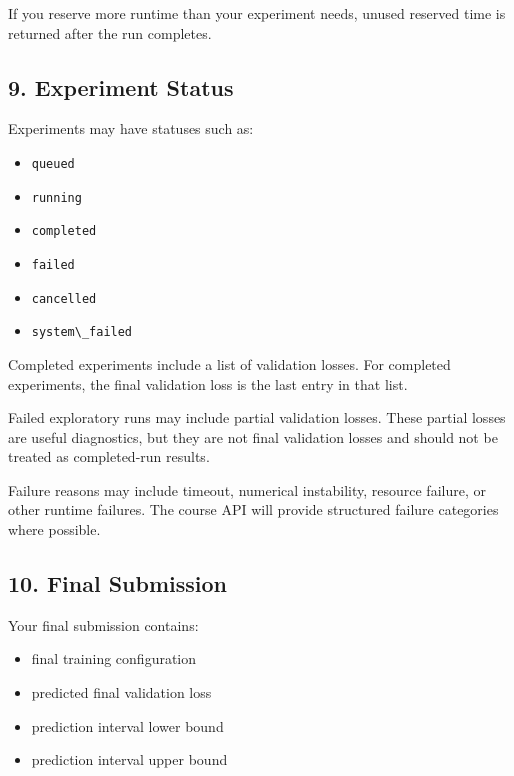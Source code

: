 \documentclass[
  11pt,
]{article}
\newcommand{\passthrough}[1]{#1}
\providecommand{\tightlist}{%
  \setlength{\itemsep}{0pt}\setlength{\parskip}{0pt}}
\begin{document}
If you reserve more runtime than your experiment needs, unused reserved
time is returned after the run completes.

\hypertarget{experiment-status}{%
\subsection{9. Experiment Status}\label{experiment-status}}

Experiments may have statuses such as:

\begin{itemize}
\tightlist
\item
  \passthrough{\lstinline!queued!}
\item
  \passthrough{\lstinline!running!}
\item
  \passthrough{\lstinline!completed!}
\item
  \passthrough{\lstinline!failed!}
\item
  \passthrough{\lstinline!cancelled!}
\item
  \passthrough{\lstinline!system\_failed!}
\end{itemize}

Completed experiments include a list of validation losses. For completed
experiments, the final validation loss is the last entry in that list.

Failed exploratory runs may include partial validation losses. These
partial losses are useful diagnostics, but they are not final validation
losses and should not be treated as completed-run results.

Failure reasons may include timeout, numerical instability, resource
failure, or other runtime failures. The course API will provide
structured failure categories where possible.

\hypertarget{final-submission}{%
\subsection{10. Final Submission}\label{final-submission}}

Your final submission contains:

\begin{itemize}
\tightlist
\item
  final training configuration
\item
  predicted final validation loss
\item
  prediction interval lower bound
\item
  prediction interval upper bound
\end{itemize}
\end{document}
